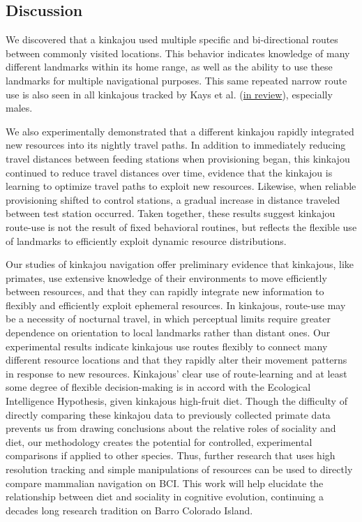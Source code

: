 \documentclass[twoside,12pt,final]{ucthesis-CA2012}
\begin{document}
\begin{ucmainmatter}
{\section{Discussion}\label{discussion-2}}

We discovered that a kinkajou used multiple specific and bi-directional routes between commonly visited locations. This behavior indicates knowledge of many different landmarks within its home range, as well as the ability to use these landmarks for multiple navigational purposes. This same repeated narrow route use is also seen in all kinkajous tracked by Kays et al. (\protect\hyperlink{ref-kaysinreview}{in review}), especially males.

We also experimentally demonstrated that a different kinkajou rapidly integrated new resources into its nightly travel paths. In addition to immediately reducing travel distances between feeding stations when provisioning began, this kinkajou continued to reduce travel distances over time, evidence that the kinkajou is learning to optimize travel paths to exploit new resources. Likewise, when reliable provisioning shifted to control stations, a gradual increase in distance traveled between test station occurred. Taken together, these results suggest kinkajou route-use is not the result of fixed behavioral routines, but reflects the flexible use of landmarks to efficiently exploit dynamic resource distributions.

Our studies of kinkajou navigation offer preliminary evidence that kinkajous, like primates, use extensive knowledge of their environments to move efficiently between resources, and that they can rapidly integrate new information to flexibly and efficiently exploit ephemeral resources. In kinkajous, route-use may be a necessity of nocturnal travel, in which perceptual limits require greater dependence on orientation to local landmarks rather than distant ones. Our experimental results indicate kinkajous use routes flexibly to connect many different resource locations and that they rapidly alter their movement patterns in response to new resources. Kinkajous' clear use of route-learning and at least some degree of flexible decision-making is in accord with the Ecological Intelligence Hypothesis, given kinkajous high-fruit diet. Though the difficulty of directly comparing these kinkajou data to previously collected primate data prevents us from drawing conclusions about the relative roles of sociality and diet, our methodology creates the potential for controlled, experimental comparisons if applied to other species. Thus, further research that uses high resolution tracking and simple manipulations of resources can be used to directly compare mammalian navigation on BCI. This work will help elucidate the relationship between diet and sociality in cognitive evolution, continuing a decades long research tradition on Barro Colorado Island.


\end{ucmainmatter}
\end{document}
